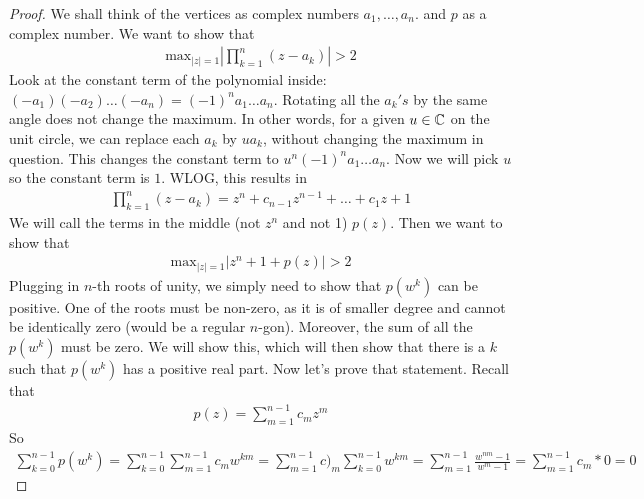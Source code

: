 \documentclass{memoir}
\begin{document}
\begin{proof}
We shall think of the vertices as complex numbers \(a_1,\ldots,a_n\). and \(p\) as a complex number. We want to show that
\begin{align*}
	\textrm{max}_{|z|=1} \left| \prod_{k=1}^{n} (z-a_k)  \right| > 2
\end{align*}
Look at the constant term of the polynomial inside: \((-a_1)(-a_2)\ldots(-a_n) = (-1)^{n}a_1\ldots a_n\). Rotating all the \(a_k's\) by the same angle does not change the maximum. In other words, for a given \(u \in \mathbb{C}\) on the unit circle, we can replace each \(a_k\) by \(ua_k\), without changing the maximum in question. This changes the constant term to \(u^{n}(-1)^{n}a_1\ldots a_n\). Now we will pick \(u\) so the constant term is \(1\). WLOG, this results in
 \begin{align*}
	 \prod_{k=1}^{n} (z-a_k) = z^{n} + c_{n-1}z^{n-1} + \ldots + c_1 z + 1 
\end{align*}
We will call the terms in the middle (not \(z^n\) and not 1) \(p(z)\). Then we want to show that
\begin{align*}
	\textrm{max}_{|z| = 1} |z^{n}+1+p(z)| > 2
\end{align*}
Plugging in \(n\)-th roots of unity, we simply need to show that \(p(w^{k})\) can be positive. One of the roots must be non-zero, as it is of smaller degree and cannot be identically zero (would be a regular \(n\)-gon). Moreover, the sum of all the \(p(w^{k})\) must be zero. We will show this, which will then show that there is a \(k\) such that \(p(w^{k})\) has a positive real part. Now let's prove that statement. Recall that
\begin{align*}
	p(z) = \sum_{m=1}^{n-1} c_m z^{m}
\end{align*}
So
\begin{align*}
	\sum_{k=0}^{n-1} p(w^{k}) = \sum_{k=0}^{n-1} \sum_{m=1}^{n-1} c_m w^{km} = \sum_{m=1}^{n-1} c)_m \sum_{k=0}^{n-1} w^{km} = \sum_{m=1}^{n-1} \frac{w^{nm}-1}{w^{m}-1} = \sum_{m=1}^{n-1} c_m * 0 = 0
\end{align*}
\end{proof}
\end{document}
